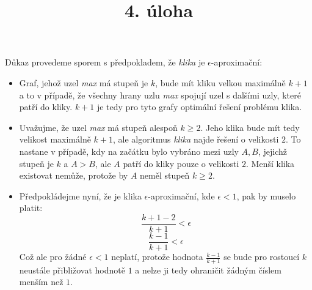 \documentclass[a4paper]{article}
\title {4. úloha}
\begin{document}
\section*{}
Důkaz provedeme sporem s předpokladem, že \emph{klika} je $\epsilon$-aproximační:
\begin{itemize}
    \item Graf, jehož uzel \emph{max} má stupeň je $k$, bude mít kliku velkou maximálně $k+1$ a to v případě,
    že všechny hrany uzlu \emph{max} spojují uzel s dalšími uzly, které patří do kliky.
    $k+1$ je tedy pro tyto grafy optimální řešení problému klika.
    \item Uvažujme, že uzel \emph{max} má stupeň alespoň $k \geq 2$.
    Jeho klika bude mít tedy velikost maximálně $k+1$,
    ale algoritmus \emph{klika} najde řešení o velikosti $2$.
    To nastane v případě, kdy na začátku bylo vybráno mezi uzly $A,B$, jejichž stupeň je $k$ a $A>B$,
    ale $A$ patří do kliky pouze o velikosti $2$.
    Menší klika existovat nemůže, protože by $A$ neměl stupeň $k \geq 2$.
    \item Předpokládejme nyní, že je klika $\epsilon$-aproximační, kde $\epsilon <1$, pak by muselo platit:
    $$ \frac{k+1-2}{k+1} < \epsilon$$
    $$ \frac{k-1}{k+1} < \epsilon$$
    Což ale pro žádné $\epsilon < 1$ neplatí, protože hodnota $\frac{k-1}{k+1}$ se bude pro rostoucí $k$
    neustále přibližovat hodnotě $1$ a nelze ji tedy ohraničit žádným číslem menším než $1$.
\end{itemize}
\section*{}
\end{document}
